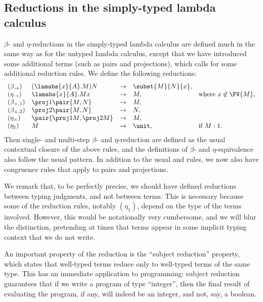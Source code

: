 \documentclass[12pt]{article}
\begin{document}
\subsection{Reductions in the simply-typed lambda calculus}
\label{subsec-simply-reductions}

$\beta$- and $\eta$-reductions in the simply-typed lambda calculus are
defined much in the same way as for the untyped lambda calculus,
except that we have introduced some additional terms (such as pairs
and projections), which calls for some additional reduction rules. 
We define the following reductions:
\[ \begin{array}{lllll}\label{page-typed-reductions}
  (\beta_{\to}) & (\lamabs{x}{A}.M)N & \to & \subst{M}{N}{x}, \\
  (\eta_{\to}) &  \lamabs{x}{A}.Mx & \to & M, & \mbox{where $x\not\in\FV{M}$},\\
  (\beta_{\times,1}) & \proj1\pair{M,N} & \to & M,\\
  (\beta_{\times,2}) & \proj2\pair{M,N} & \to & N,\\
  (\eta_{\times}) & \pair{\proj1 M,\proj2 M} & \to & M,\\
  (\eta_{1}) & M & \to & \unit, & \mbox{if $M:1$}.
\end{array}
\]
Then single- and multi-step $\beta$- and $\eta$-reduction are defined
as the usual contextual closure of the above rules, and the
definitions of $\beta$- and $\eta$-equivalence also follow the usual
pattern. In addition to the usual {} and {\nrule{\xi}}
rules, we now also have congruence rules that apply to pairs and
projections. 

We remark that, to be perfectly precise, we should have defined
reductions between typing judgments, and not between terms. This is
necessary because some of the reduction rules, notably $(\eta_{1})$,
depend on the type of the terms involved. However, this would be
notationally very cumbersome, and we will blur the distinction,
pretending at times that terms appear in some implicit typing context
that we do not write. 

An important property of the reduction is the ``subject reduction''
property, which states that well-typed terms reduce only to well-typed
terms of the same type. This has an immediate application to
programming: subject reduction guarantees that if we write a program
of type ``integer'', then the final result of evaluating the program,
if any, will indeed be an integer, and not, say, a boolean. 
\end{document}

